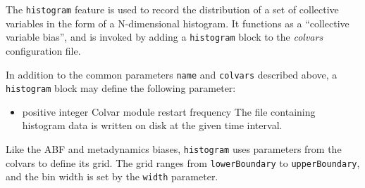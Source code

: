 The \texttt{histogram} feature is used to record the distribution of a set of collective
variables in the form of a N-dimensional histogram.
It functions as a ``collective variable bias'', and is invoked by adding a
\texttt{histogram} block to the \textit{colvars} configuration file.

In addition to the common parameters \texttt{name} and \texttt{colvars}
described above, a \texttt{histogram} block may define the following parameter:

\begin{itemize}
\item {}
  {positive integer}
  {Colvar module restart frequency}
  {The file containing histogram data is written on disk at the given time interval.}
\end{itemize}

Like the ABF and metadynamics biases, \texttt{histogram} uses
parameters from the colvars to define its grid.  The grid ranges from
\texttt{lowerBoundary} to \texttt{upperBoundary}, and the bin width is
set by the \texttt{width} parameter.

